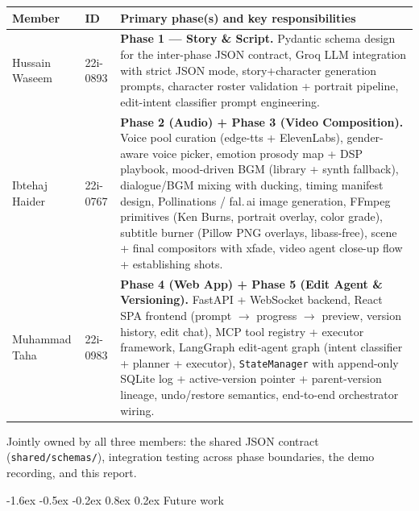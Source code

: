 \documentclass[11pt,a4paper]{article}
\makeatletter
\renewcommand{\arraystretch}{1.25}
\renewcommand\section{\@startsection{section}{1}{\z@}%
   {-1.6ex \@plus -0.5ex \@minus -0.2ex}%
   {0.8ex \@plus 0.2ex}%
   {\Large\bfseries\color{accent}}}
\newcommand{\code}[1]{\texttt{\small #1}}
\makeatother
\begin{document}
\renewcommand{\arraystretch}{1.4}
\begin{tabularx}{\textwidth}{l l X}
\toprule
\textbf{Member} & \textbf{ID} & \textbf{Primary phase(s) and key responsibilities} \\
\midrule
Hussain Waseem &
22i-0893 &
\textbf{Phase 1 --- Story \& Script.} Pydantic schema design for the
inter-phase JSON contract, Groq LLM integration with strict JSON mode,
story+character generation prompts, character roster validation + portrait
pipeline, edit-intent classifier prompt engineering. \\
Ibtehaj Haider &
22i-0767 &
\textbf{Phase 2 (Audio) + Phase 3 (Video Composition).} Voice pool curation
(edge-tts + ElevenLabs), gender-aware voice picker, emotion prosody map +
DSP playbook, mood-driven BGM (library + synth fallback), dialogue/BGM mixing
with ducking, timing manifest design, Pollinations / fal.\,ai image
generation, FFmpeg primitives (Ken Burns, portrait overlay, color grade),
subtitle burner (Pillow PNG overlays, libass-free), scene + final
compositors with xfade, video agent close-up flow + establishing shots. \\
Muhammad Taha &
22i-0983 &
\textbf{Phase 4 (Web App) + Phase 5 (Edit Agent \& Versioning).} FastAPI +
WebSocket backend, React SPA frontend (prompt $\rightarrow$ progress $\rightarrow$
preview, version history, edit chat), MCP tool registry + executor framework,
LangGraph edit-agent graph (intent classifier + planner + executor),
\code{StateManager} with append-only SQLite log + active-version pointer +
parent-version lineage, undo/restore semantics, end-to-end orchestrator
wiring. \\
\bottomrule
\end{tabularx}
\renewcommand{\arraystretch}{1.25}

\smallskip
Jointly owned by all three members: the shared JSON contract
(\code{shared/schemas/}), integration testing across phase boundaries, the
demo recording, and this report.

\section{Future work}
\end{document}
